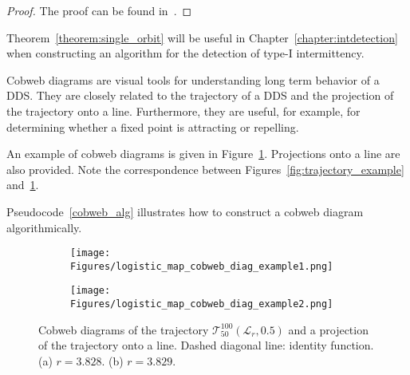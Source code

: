 \begin{proof}
    The proof can be found in~\cite[p.~74]{Devaney20211026}.
\end{proof}

\begin{remark}
Theorem~\ref{theorem:single_orbit} will be useful in Chapter~\ref{chapter:intdetection} when constructing an algorithm for the detection of type-I intermittency.
\end{remark}

\begin{remark}
\label{def:cobweb}
    Cobweb diagrams are visual tools for understanding long term behavior of a DDS.
    They are closely related to the trajectory of a DDS and the projection of the trajectory onto a line.
    Furthermore, they are useful, for example, for determining whether a fixed point is attracting or repelling.
    \par
    An example of cobweb diagrams is given in Figure~\ref{fig:cobweb_diag_example}.
    Projections onto a line are also provided.
    Note the correspondence between Figures~\ref{fig:trajectory_example} and~\ref{fig:cobweb_diag_example}.
    \par
    Pseudocode~\ref{cobweb_alg} illustrates how to construct a cobweb diagram algorithmically.
\end{remark}

\begin{figure}[!h]
    \centering
    \begin{subfigure}{0.6\textwidth}
        \centering
        \texttt{[image: Figures/logistic\_map\_cobweb\_diag\_example1.png]}
        \caption{}
    \end{subfigure}
    \hfill
    \begin{subfigure}{0.6\textwidth}
        \centering
        \texttt{[image: Figures/logistic\_map\_cobweb\_diag\_example2.png]}
        \caption{}
    \end{subfigure}

    \caption{
        Cobweb diagrams of the trajectory $\mathcal{T}_{50}^{100}(\mathcal{L}_{r}, 0.5)$ and a projection of the trajectory onto a line. 
        Dashed diagonal line: identity function. 
        (a) $r = 3.828$. 
        (b) $r = 3.829$. 
        }
    \label{fig:cobweb_diag_example}
\end{figure}

